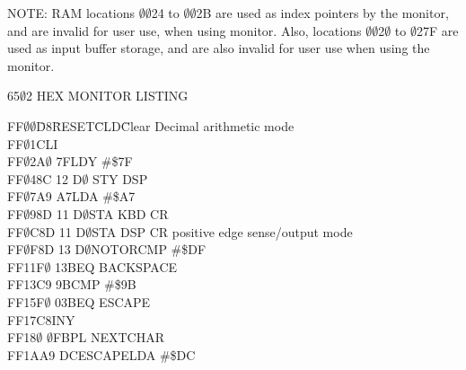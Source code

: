 \documentclass[letterpaper]{article}
\begin{document}
\newpage
\begin{multicols}{2}

\end{multicols}
\begin{center}
NOTE: RAM locations $\emptyset$$\emptyset$24 to $\emptyset$$\emptyset$2B are used as index pointers by the monitor, and are invalid for user use, when using monitor. Also, locations $\emptyset$$\emptyset$2$\emptyset$ to $\emptyset$27F are used as input buffer storage, and are also invalid for user use when using the monitor.

\newpage

65$\emptyset$2 HEX MONITOR LISTING
\end{center}
{\ttfamily %
\begin{tabbing}
FF$\emptyset\emptyset$\hspace{.18in}\=D8\hspace{.75in}\=RESET\hspace{.5in}\=CLD\hspace{1.25in}\={\rmfamily Clear Decimal arithmetic mode}\\
FF$\emptyset$1\>\>CLI\>\\
FF$\emptyset$2\>A$\emptyset$ 7F\>\>LDY \#\$7F\\
FF$\emptyset$4\>8C 12 D$\emptyset$ \> \>STY DSP \\
FF$\emptyset$7\>A9 A7\>\>LDA \#\$A7\\
FF$\emptyset$9\>8D 11 D$\emptyset$\>\>STA KBD CR\\
FF$\emptyset$C\>8D 11 D$\emptyset$\>\>STA DSP CR\> {\rmfamily \hspace{.125in}positive edge sense/output mode}\\
FF$\emptyset$F\>8D 13 D$\emptyset$\>NOTOR\>CMP \#\$DF\\
FF11\>F$\emptyset$ 13\>\>BEQ BACKSPACE\\
FF13\>C9 9B\>\>CMP \#\$9B\\
FF15\>F$\emptyset$ 03\>\>BEQ ESCAPE\\
FF17\>C8\>\>INY\\
FF18$\emptyset$ $\emptyset$F\>\>BPL NEXTCHAR\\
FF1A\>A9 DC\>ESCAPE\>LDA \#\$DC\\

\end{tabbing}}
\end{document}
